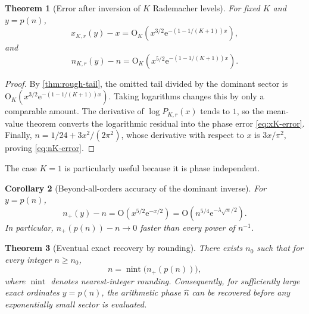 \documentclass[11pt,a4paper]{article}
\numberwithin{equation}{section}
\newtheorem{theorem}{Theorem}[section]
\newtheorem{corollary}[theorem]{Corollary}
\theoremstyle{remark}
\newcommand{\e}{\mathrm e}
\newcommand{\bigO}{\mathrm O}
\begin{document}
\begin{theorem}[Error after inversion of $K$ Rademacher levels]\label{thm:inverse-tail}
For fixed $K$ and $y=p(n)$,
\begin{equation}\label{eq:xK-error}
 x_{K,r}(y)-x
 =\bigO_K\!\left(
 x^{3/2}\e^{-(1-1/(K+1))x}
 \right),
\end{equation}
and
\begin{equation}\label{eq:nK-error}
 n_{K,r}(y)-n
 =\bigO_K\!\left(
 x^{5/2}\e^{-(1-1/(K+1))x}
 \right).
\end{equation}
\end{theorem}

\begin{proof}
By \cref{thm:rough-tail}, the omitted tail divided by the dominant sector is
$\bigO_K(x^{3/2}\e^{-(1-1/(K+1))x})$.  Taking logarithms changes this by only a comparable amount.  The derivative of $\log P_{K,r}(x)$ tends to $1$, so the mean-value theorem converts the logarithmic residual into the phase error \cref{eq:xK-error}.  Finally,
$n=1/24+3x^2/(2\pi^2)$, whose derivative with respect to $x$ is $3x/\pi^2$, proving \cref{eq:nK-error}.
\end{proof}

The case $K=1$ is particularly useful because it is phase independent.

\begin{corollary}[Beyond-all-orders accuracy of the dominant inverse]\label{cor:dominant-inverse-error}
For $y=p(n)$,
\begin{equation}\label{eq:nplus-error}
 n_+(y)-n=\bigO\!\left(x^{5/2}\e^{-x/2}\right)
 =\bigO\!\left(n^{5/4}\e^{-\lambda\sqrt n/2}\right).
\end{equation}
In particular, $n_+(p(n))-n\to0$ faster than every power of $n^{-1}$.
\end{corollary}

\begin{theorem}[Eventual exact recovery by rounding]\label{thm:eventual-rounding}
There exists $n_0$ such that for every integer $n\ge n_0$,
\begin{equation}\label{eq:rounding-exact}
 n=\operatorname{nint}\bigl(n_+(p(n))\bigr),
\end{equation}
where $\operatorname{nint}$ denotes nearest-integer rounding.  Consequently, for sufficiently large exact ordinates $y=p(n)$, the arithmetic phase $\widehat n$ can be recovered before any exponentially small sector is evaluated.
\end{theorem}
\end{document}

